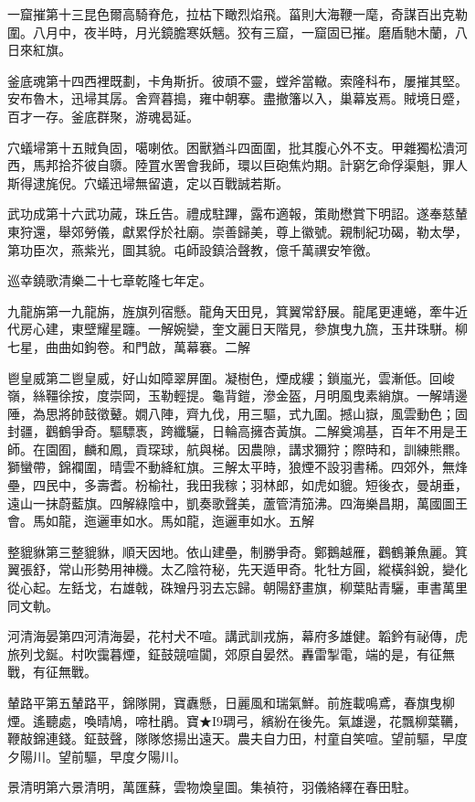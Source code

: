 \begin{pinyinscope}
一窟摧第十三昆色爾高騎脊危，拉枯下瞰烈焰飛。菑則大海鞭一麾，奇謀百出克勒圍。八月中，夜半時，月光鏡膽寒妖魑。狡有三窟，一窟固已摧。磨盾馳木蘭，八日來紅旗。

釜底魂第十四西裡既劃，卡角斯折。彼頑不靈，螳斧當轍。索隆科布，屢摧其堅。安布魯木，迅埽其孱。舍齊暮搗，雍中朝搴。盡撤籓以入，巢幕岌焉。賊境日蹙，百才一存。釜底群聚，游魂曷延。

穴蟻埽第十五賊負固，噶喇依。困獸猶斗四面圍，批其腹心外不支。甲雜獨松潰河西，馬邦拾芥彼自隳。陸罝水罟會我師，環以巨砲焦灼期。計窮乞命俘渠魁，罪人斯得逮旄倪。穴蟻迅埽無留遺，定以百戰誠若斯。

武功成第十六武功蕆，珠丘告。禮成駐蹕，露布適報，策勛懋賞下明詔。遂奉慈輦東狩還，舉郊勞儀，獻累俘於社廟。崇善歸美，尊上徽號。親制紀功碣，勒太學，第功臣次，燕紫光，圖其貌。屯師設鎮洽聲教，億千萬禩安笮徼。

巡幸鐃歌清樂二十七章乾隆七年定。

九龍旃第一九龍旃，旌旗列宿懸。龍角天田見，箕翼常舒展。龍尾更連蜷，牽牛近代房心建，東壁耀星躔。一解婉孌，奎文麗日天階見，參旗曳九旒，玉井珠駢。柳七星，曲曲如鉤卷。和門啟，萬幕褰。二解

鬯皇威第二鬯皇威，好山如障翠屏圍。凝樹色，煙成縷；鎖嵐光，雲漸低。回峻嶺，絲韁徐按，度崇岡，玉勒輕提。龜背鎧，滲金盔，月明風曳素綃旗。一解靖邊陲，為思將帥鼓徵鼙。嫺八陣，齊九伐，用三驅，式九圍。撼山嶽，風雲動色；固封疆，鸛鶴爭奇。驅驃褭，跨纖驪，日輪高擁杏黃旗。二解奠鴻基，百年不用是王師。在園囿，麟和鳳，貢琛球，航與梯。因農隙，講求獮狩；際時和，訓練熊羆。獅蠻帶，錦襴圍，晴雲不動絳紅旗。三解太平時，狼煙不設羽書稀。四郊外，無烽壘，四民中，多壽耆。枌榆社，我田我稼；羽林郎，如虎如貔。短後衣，曼胡垂，遠山一抹蔚藍旗。四解綠陰中，凱奏歌聲美，蘆管清笳沸。四海樂昌期，萬國圖王會。馬如龍，迤邐車如水。馬如龍，迤邐車如水。五解

整貔貅第三整貔貅，順天因地。依山建壘，制勝爭奇。鄭鵝越雁，鸛鶴兼魚麗。箕翼張舒，常山形勢用神機。太乙陰符秘，先天遁甲奇。牝牡方圓，縱橫斜銳，變化從心起。左銛戈，右雄戟，硃矰丹羽去忘歸。朝陽舒畫旗，柳葉貼青驪，車書萬里同文軌。

河清海晏第四河清海晏，花村犬不喧。講武訓戎旃，幕府多雄健。韜鈐有祕傳，虎旅列戈鋋。村吹靄暮煙，鉦鼓競喧闐，郊原自晏然。轟雷掣電，端的是，有征無戰，有征無戰。

輦路平第五輦路平，錦隊開，寶纛懸，日麗風和瑞氣鮮。前旌載鳴鳶，春旗曳柳煙。遙聽處，喚晴鳩，啼杜鵑。寶★I9琱弓，繽紛在後先。氣雄邊，花飄柳葉韉，鞭敲錦連錢。鉦鼓聲，隊隊悠揚出遠天。農夫自力田，村童自笑喧。望前驅，早度夕陽川。望前驅，早度夕陽川。

景清明第六景清明，萬匯蘇，雲物煥皇圖。集禎符，羽儀絡繹在春田駐。


\end{pinyinscope}
